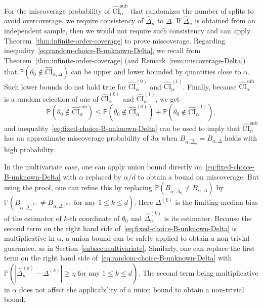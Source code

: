 \documentclass{article}
\numberwithin{myalgctr}{section}
\begin{document}
For the miscoverage probability of $\widehat{\mathrm{CI}}_{\alpha}^{\mathrm{sub}}$ that randomizes the number of splits to avoid overcoverage, we require consistency of $\widehat{\Delta}_n$ to $\Delta$. If $\widehat{\Delta}_n$ is obtained from an independent sample, then we would not require such consistency and can apply Theorem~\ref{thm:infinite-order-coverage} to prove miscoverage. Regarding inequality~\eqref{eq:random-choice-B-unknown-Delta}, we recall from Theorem~\ref{thm:infinite-order-coverage} (and Remark~\ref{rem:miscoverage-Delta}) that $\mathbb{P}(\theta_0 \notin \widehat{\mathrm{CI}}_{\alpha,\Delta})$ can be upper and lower bounded by quantities close to $\alpha$. 
Such lower bounds do not hold true for $\widehat{\mathrm{CI}}_{\alpha}^{(0)}$ and $\widehat{\mathrm{CI}}_{\alpha}^{(1)}$. Finally, because $\widehat{\mathrm{CI}}_{\alpha}^{\mathrm{sub}}$ is a random selection of one of $\widehat{\mathrm{CI}}_{\alpha}^{(0)}$ and $\widehat{\mathrm{CI}}_{\alpha}^{(1)}$, we get
\[
\mathbb{P}(\theta_0 \notin \widehat{\mathrm{CI}}_{\alpha}^{\mathrm{sub}}) \le \mathbb{P}(\theta_0 \notin \widehat{\mathrm{CI}}^{(0)}_{\alpha}) + \mathbb{P}(\theta_0 \notin \widehat{\mathrm{CI}}_{\alpha}^{(1)}),
\] 
and inequality~\eqref{eq:fixed-choice-B-unknown-Delta} can be used to imply that $\widehat{\mathrm{CI}}_{\alpha}^{\mathrm{sub}}$ has an approximate miscoverage probability of $3\alpha$ when $B_{\alpha,\widehat{\Delta}_n} = B_{\alpha,\Delta}$ holds with high probability. 


In the multivariate case, one can apply union bound directly on~\eqref{eq:fixed-choice-B-unknown-Delta} with $\alpha$ replaced by $\alpha/d$ to obtain a bound on miscoverage. But using the proof, one can refine this by replacing  $\mathbb{P}(B_{\alpha,\widehat{\Delta}_n} \neq B_{\alpha,\Delta})$  by $\mathbb{P}(B_{\alpha,\widehat{\Delta}_n^{(k)}} \neq B_{\alpha,\Delta^{(k)}} \mbox{ for any } 1\le k\le d)$. Here $\Delta^{(k)}$ is the limiting median bias of the estimator of $k$-th coordinate of $\theta_0$ and $\widehat{\Delta}_n^{(k)}$ is its estimator. Because the second term on the right hand side of~\eqref{eq:fixed-choice-B-unknown-Delta} is multiplicative in $\alpha$, a union bound can be safely applied to obtain a non-trivial guarantee, as in Section~\ref{subsec:multivariate}. Similarly, one can replace the first term on the right hand side of~\eqref{eq:random-choice-B-unknown-Delta} with $\mathbb{P}(|\widehat{\Delta}_n^{(k)} - \Delta^{(k)}| \ge \eta\mbox{ for any }1\le k\le d)$. The second term being multiplicative in $\alpha$ does not affect the applicability of a union bound to obtain a non-trivial bound.
\end{document}
